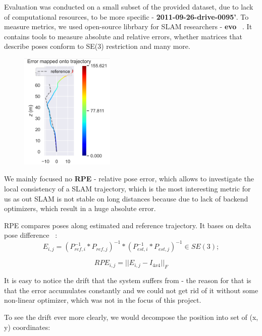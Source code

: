 Evaluation was conducted on a small subset of the provided dataset, due to lack of computational resources, to be more specific - {\bf 2011-09-26-drive-0095'}. 
To measure metrics, we used open-source librbary for SLAM researchers - {\bf evo} ~\cite{Evo}. It contains tools to measure absolute and relative errors, whether matrices that describe poses conform to SE(3) restriction and many more. 

\begin{figure}
    \centering
    \includegraphics[width=0.4\textwidth]{results/error_mapped.png}
\end{figure}

We mainly focused no {\bf RPE} - relative pose error, which allows to investigate the local consistency of a SLAM trajectory, which is the most interesting metric for us as out SLAM is not stable on long distances because due to lack of backend optimizers, which result in a huge absolute error.

RPE compares poses along estimated and reference trajectory. It bases on delta pose difference ~\cite{ErrorMeasurement}: 
\begin{equation}
E_{i, j} = (P^{-1}_{ref, i} * P_{ref, j})^{-1} * (P^{-1}_{est, i} * P_{est, j})^{-1} \in SE(3);
\end{equation}

\begin{equation}
    RPE_{i, j} = ||E_{i, j} - I_{4 x 4}||_{F}
\end{equation}

It is easy to notice the drift that the system suffers from - the reason for that is that the error accumulates constantly and we could not get rid of it without some non-linear optimizer, which was not in the focus of this project.

To see the drift ever more clearly, we would decompose the position into set of (x, y) coordinates:

